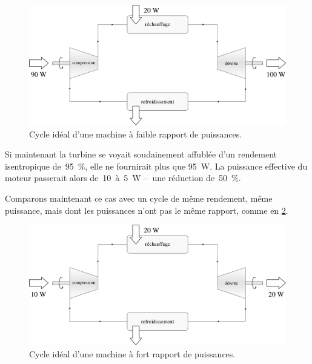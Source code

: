 		\begin{figure}
			\begin{center}
				\includegraphics[width=\textwidth]{images/cours10-img3.png}
			\end{center}
			\caption{Cycle idéal d’une machine à faible rapport de puissances.}
			\label{fig_rapport_puissances_1}
		\end{figure}

		Si maintenant la turbine se voyait soudainement affublée d’un rendement isentropique de~\SI{95}{\percent}, elle ne fournirait plus que \SI{95}{\watt}. La puissance effective du moteur passerait alors de~\num{10}~à~\SI{5}{\watt} --\ une réduction de~\SI{50}{\percent}.

		Comparons maintenant ce cas avec un cycle de même rendement, même puissance, mais dont les puissances n’ont pas le même rapport, comme en \cref{fig_rapport_puissances_2}.

		\begin{figure}
			\begin{center}
				\includegraphics[width=\textwidth]{images/cours10-img4.png}
			\end{center}
			\caption{Cycle idéal d’une machine à fort rapport de puissances.}
			\label{fig_rapport_puissances_2}
		\end{figure}

